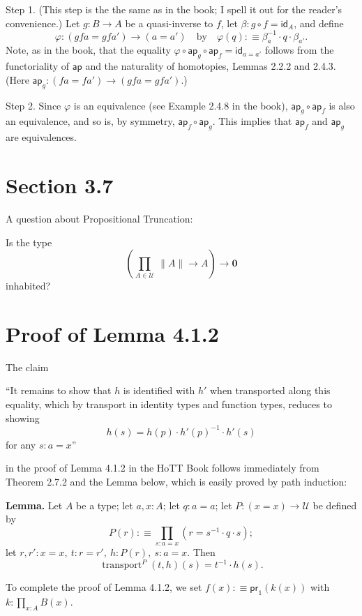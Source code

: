 \documentclass[12pt]{article}
\newcommand{\msf}{\mathsf}
\newcommand{\ap}{\mathsf{ap}}
\newcommand{\ee}{\equiv}
\newcommand{\id}{\mathsf{id}}
\newcommand{\nn}{\noindent}
\newcommand{\oo}{\operatorname}
\newcommand{\U}{\mathcal U}
\begin{document}
Step 1. (This step is the the same as in the book; I spell it out for the reader's convenience.) Let $g:B\to A$ be a quasi-inverse to $f$, let $\beta:g\circ f=\id_A$, and define 
$$
\varphi:(gfa=gfa')\to(a=a')\quad\text{by}\quad\varphi(q):\equiv\beta_a^{-1}\cdot q\cdot\beta_{a'}.
$$ 
Note, as in the book, that the equality $\varphi\circ\ap_g\circ\ap_f=\id_{a=a'}$ follows from the functoriality of $\ap$ and the naturality of homotopies, Lemmas 2.2.2 and 2.4.3. (Here $\ap_g:(fa=fa')\to (gfa=gfa')$.)

Step 2. Since $\varphi$ is an equivalence (see Example 2.4.8 in the book), $\ap_g\circ\ap_f$ is also an equivalence, and so is, by symmetry, $\ap_f\circ\ap_g$. This implies that $\ap_f$ and $\ap_g$ are equivalences.



\section{Section 3.7}

A question about Propositional Truncation:

Is the type 
$$
\left(\prod_{A\in\mathcal U}\ \lVert A\rVert\to A\right)\to\mathbf0
$$ 
inhabited?


\section{Proof of Lemma 4.1.2}

The claim

\nn ``It remains to show that $h$ is identified with $h'$ when transported along this equality, which by transport in identity types and function types, reduces to showing 
$$
h(s)=h(p)\cdot h'(p)^{-1}\cdot h'(s)
$$ 
for any $s:a=x$''

\nn in the proof of Lemma 4.1.2 in the HoTT Book follows immediately from Theorem 2.7.2 and the Lemma below, which is easily proved by path induction:

\nn \textbf{Lemma.} Let $A$ be a type; let $a,x:A$; let $q:a=a$; let $P:(x=x)\to\U$ be defined by 
$$
P(r):\equiv\prod_{s:a=x}(r=s^{-1}\cdot q\cdot s);
$$ 
let $r,r':x=x,\ t:r=r',\ h:P(r),\ s:a=x$. Then 
$$
\oo{transport}^P(t,h)(s)=t^{-1}\cdot h(s).
$$ 

To complete the proof of Lemma 4.1.2, we set $f(x):\ee\msf{pr}_1(k(x))$ with $k:\prod_{x:A}B(x)$.
\end{document}
